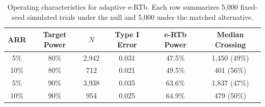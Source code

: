 \begin{table}[htbp]
\centering
\caption{Operating characteristics for adaptive e-RTb. Each row summarizes 5{,}000 fixed-seed simulated trials under the null and 5{,}000 under the matched alternative.}
\begin{tabular}{@{}cccccc@{}}
\toprule
ARR & Target Power & $N$ & Type I Error & e-RTb Power & Median Crossing \\
\midrule
5\% & 80\% & 2{,}942 & 0.031 & 47.5\% & 1{,}450 (49\%) \\
10\% & 80\% & 712 & 0.021 & 49.5\% & 401 (56\%) \\
5\% & 90\% & 3{,}938 & 0.035 & 63.6\% & 1{,}837 (47\%) \\
10\% & 90\% & 954 & 0.025 & 64.9\% & 479 (50\%) \\
\bottomrule
\end{tabular}
\label{tab:simulations}
\end{table}
